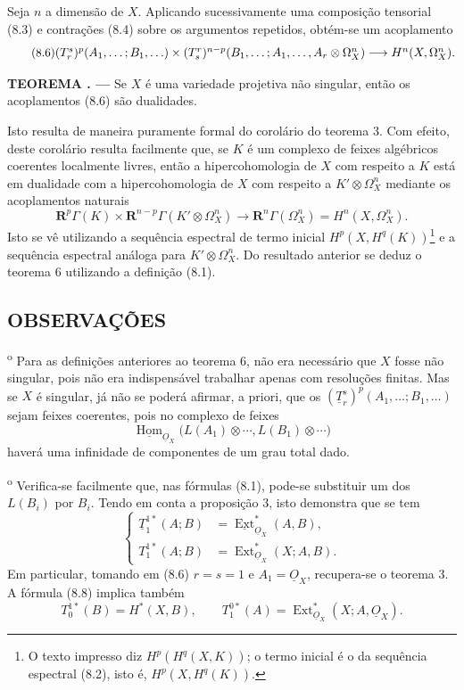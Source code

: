 \documentclass[11pt,twoside,openany]{book}
\numberwithin{equation}{section}
\newcommand{\src}[1]{%
  \phantomsection\hypertarget{src:#1}{}%
  \marginpar{\raggedleft\footnotesize\sffamily #1}%
}
\newcommand{\Osh}{\underline{O}}
\newcommand{\Homsh}{\underline{\operatorname{Hom}}}
\newcommand{\Extsh}{\underline{\operatorname{Ext}}}
\theoremstyle{plain}
\theoremstyle{definition}
\theoremstyle{remark}
\newcommand{\result}[2]{%
  \par\medskip\noindent\textbf{#1%
  \if\relax\detokenize{#2}\relax\else\space#2\fi. ---}\enspace
}
\newcommand{\FgaUnitKey}{frontmatter}
\renewcommand{\src}[1]{%
  \phantomsection\hypertarget{src:\FgaUnitKey:#1}{}%
  \marginpar{\raggedleft\footnotesize\sffamily #1}%
}
\begin{document}
Seja $n$ a dimensão de $X$. Aplicando sucessivamente uma composição
tensorial (8.3) e contrações (8.4) sobre os argumentos repetidos, obtém-se
um acoplamento
\begin{equation}\tag{8.6}
\resizebox{\textwidth}{!}{$
  (T_{r}^{s})^{p}(A_1,\ldots;B_1,\ldots)
  \times
  (T_{s}^{r})^{n-p}(B_1,\ldots;A_1,\ldots,A_r\otimes\Omega_X^{n})
  \longrightarrow H^{n}(X,\Omega_X^{n}).
$}
\end{equation}

\result{TEOREMA}{6} Se $X$ é uma variedade projetiva não singular, então
os acoplamentos (8.6) são dualidades.

Isto resulta de maneira puramente formal do corolário do teorema 3. Com efeito,
deste corolário resulta facilmente que, se $K$ é um complexo de feixes
algébricos coerentes localmente livres, então a hipercohomologia de $X$ com
respeito a $K$ está em dualidade com a hipercohomologia de $X$ com respeito a
$K'\otimes\Omega_X^{n}$ mediante os acoplamentos naturais
\begin{equation}\tag{8.7}
  \mathbf R^{p}\Gamma(K)
  \times\mathbf R^{n-p}\Gamma(K'\otimes\Omega_X^{n})
  \longrightarrow\mathbf R^{n}\Gamma(\Omega_X^{n})
  =H^{n}(X,\Omega_X^{n}).
\end{equation}
Isto se vê utilizando a sequência espectral de termo inicial
$H^{p}(X,H^{q}(K))$\footnote{O texto impresso diz
$H^{p}(H^{q}(X,K))$; o termo inicial é o da sequência espectral (8.2),
isto é, $H^{p}(X,H^{q}(K))$.} e a sequência espectral análoga para
$K'\otimes\Omega_X^{n}$. Do resultado anterior se deduz o teorema 6
utilizando a definição (8.1).

\src{192}
\subsection*{OBSERVAÇÕES}

\textsuperscript{o} Para as definições anteriores ao teorema 6,
não era necessário que $X$ fosse não singular, pois não era
indispensável trabalhar apenas com resoluções finitas. Mas se $X$
é singular, já não se poderá afirmar, a priori, que os
$(\underline{T}_{r}^{s})^{p}(A_1,\ldots;B_1,\ldots)$ sejam feixes
coerentes, pois no complexo de feixes
\[
  \Homsh_{\Osh_X}\bigl(L(A_1)\otimes\cdots,L(B_1)\otimes\cdots\bigr)
\]
haverá uma infinidade de componentes de um grau total dado.

\medskip
{}\textsuperscript{o} Verifica-se facilmente que, nas fórmulas
(8.1), pode-se substituir um dos $L(B_i)$ por $B_i$. Tendo em conta a
proposição 3, isto demonstra que se tem
\begin{equation}\tag{8.8}
\left\{
\begin{aligned}
  \underline{T}_{1}^{1*}(A;B)&=\Extsh_{\Osh_X}^{*}(A,B),\\
  T_{1}^{1*}(A;B)&=\operatorname{Ext}_{\Osh_X}^{*}(X;A,B).
\end{aligned}
\right.
\end{equation}
Em particular, tomando em (8.6) $r=s=1$ e $A_1=\Osh_X$, recupera-se o
teorema 3. A fórmula (8.8) implica também
\[
  T_{0}^{1*}(B)=H^{*}(X,B),
  \qquad
  T_{1}^{0*}(A)=\operatorname{Ext}_{\Osh_X}^{*}(X;A,\Osh_X).
\]
\end{document}
